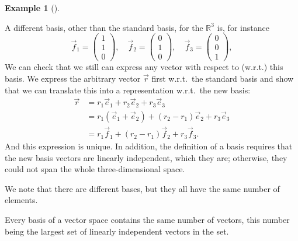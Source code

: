 \documentclass[
  a4paper,
  DIV=11,
  numbers=noendperiod,
  oneside]{scrreprt}
\theoremstyle{definition}
\newtheorem{example}{Example}[chapter]
\theoremstyle{remark}
\newenvironment{fbxSimple}[3]{\begin{tcolorbox}[enhanced, breakable,%
attach boxed title to top*={xshift=1.4pt},
boxed title style={boxrule=0.0mm, fuzzy shadow={1pt}{-1pt}{0mm}{0.1mm}{gray}, arc=.3em, rounded corners=east, sharp corners=west}, colframe=#1-color2, colbacktitle=#1-color1, colback = white, coltitle=black,  titlerule=0mm, toprule=0pt, bottomrule=.7pt, leftrule=.3em, rightrule=.7pt, outer arc=.3em,  	left=.5em, right=.5em, bottomtitle=1mm, toptitle=1mm,title=\textbf{#2}\hspace{0.5em}{#3}]}
{\end{tcolorbox}}
\begin{document}
\begin{example}[]\protect\hypertarget{exm-}{}\label{exm-}

A different basis, other than the standard basis, for the
\(\mathbb{R}^{3}\) is, for instance
\[\vec{f}_{1} =  \scriptscriptstyle \begin{pmatrix}   1\\ 1 \\ 0   \end{pmatrix} \textstyle, \quad \vec{f}_{2} =  \scriptscriptstyle \begin{pmatrix}   0\\ 1 \\ 0   \end{pmatrix} \textstyle, \quad \vec{f}_{3} =  \scriptscriptstyle \begin{pmatrix}   0\\ 0 \\ 1  \end{pmatrix} \textstyle,\]
We can check that we still can express any vector with respect to
(w.r.t.) this basis. We express the arbitrary vector \(\vec{r}\) first
w.r.t.~the standard basis and show that we can translate this into a
representation w.r.t.~the new basis: \[\begin{aligned}
 \vec{r} & = r_{1} \vec{e}_{1} + r_{2} \vec{e}_{2} +r_{3} \vec{e}_{3}  \\
  & = r_{1} (\vec{e}_{1} + \vec{e}_{2})  + (r_{2}-r_{1}) \vec{e}_{2} +r_{3} \vec{e}_{3}  \\
  & = r_{1} \vec{f}_{1} + (r_{2}-r_{1}) \vec{f}_{2} +r_{3} \vec{f}_{3}  .
\end{aligned}\] And this expression is unique. In addition, the
definition of a basis requires that the new basis vectors are linearly
independent, which they are; otherwise, they could not span the whole
three-dimensional space.

\end{example}

We note that there are different bases, but they all have the same
number of elements.

\label{number-of-elements-of-a-basis}
\begin{fbxSimple}{Theorem}{Theorem 2.8: }{Number of elements of a basis}
\label{number-of-elements-of-a-basis}
Every basis of a vector space contains the same number of vectors, this
number being the largest set of linearly independent vectors in the set.

\end{fbxSimple}
\end{document}
